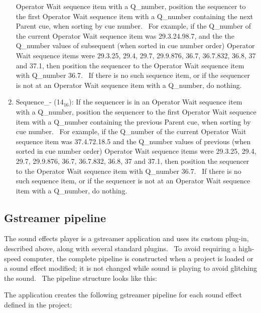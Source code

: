 \documentclass[letterpaper]{article}
\newcommand\textsubscript[1]{\ensuremath{{}_{\text{#1}}}}
\begin{document}
\begin{enumerate}
Operator Wait sequence item with a Q\_number, position the sequencer to
the first Operator Wait sequence item with a Q\_number containing the
next Parent cue, when sorting by cue number. \ For example, if the
Q\_number of the current Operator Wait sequence item was 29.3.24.98.7,
and the the Q\_number values of subsequent (when sorted in cue number
order) Operator Wait sequence items were 29.3.25, 29.4, 29.7, 29.9.876,
36.7, 36.7.832, 36.8, 37 and 37.1, then position the sequencer to the
Operator Wait sequence item with Q\_number 36.7. \ If there is no such
sequence item, or if the sequencer is not at an Operator Wait sequence
item with a Q\_number, do nothing.
\item Sequence\_- (14\textsubscript{16}): If the sequencer is in an
Operator Wait sequence item with a Q\_number, position the sequencer to
the first Operator Wait sequence item with a Q\_number containing the
previous Parent cue, when sorting by cue number. \ For example, if the
Q\_number of the current Operator Wait sequence item was 37.4.72.18.5
and the Q\_number values of previous (when sorted in cue number order)
Operator Wait sequence items were 29.3.25, 29.4, 29.7, 29.9.876, 36.7,
36.7.832, 36.8, 37 and 37.1, then position the sequencer to the
Operator Wait sequence item with Q\_number 36.7. \ If there is no such
sequence item, or if the sequencer is not at an Operator Wait sequence
item with a Q\_number, do nothing.
\end{enumerate}
\subsection[Gstreamer pipeline]{Gstreamer pipeline}
The sound effects player is a gstreamer application and uses its custom
plug-in, described above, along with several standard plugins. \ To
avoid requiring a high-speed computer, the complete pipeline is
constructed when a project is loaded or a sound effect modified; it is
not changed while sound is playing to avoid glitching the sound. \ The
pipeline structure looks like this:

The application creates the following gstreamer pipeline for each sound
effect defined in the project:
\end{document}
